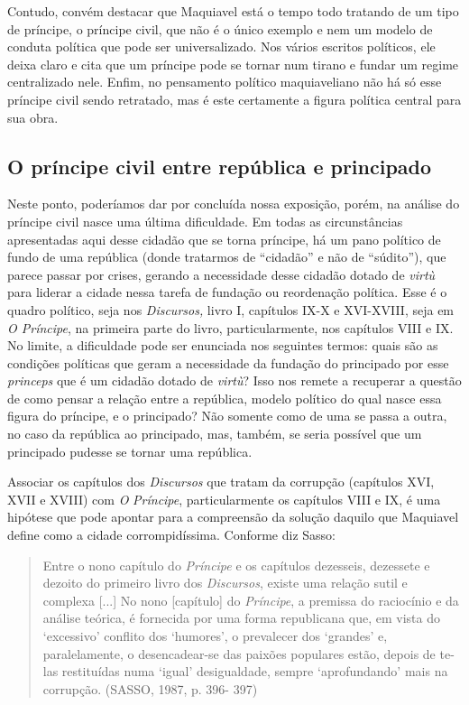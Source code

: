 Contudo, convém destacar que Maquiavel está o tempo todo tratando de um
tipo de príncipe, o príncipe civil, que não é o único exemplo e nem um
modelo de conduta política que pode ser universalizado. Nos vários
escritos políticos, ele deixa claro e cita que um príncipe pode se
tornar num tirano e fundar um regime centralizado nele. Enfim, no
pensamento político maquiaveliano não há só esse príncipe civil sendo
retratado, mas é este certamente a figura política central para sua
obra.

\subsection{O príncipe civil entre república e principado}

Neste ponto, poderíamos dar por concluída nossa exposição, porém, na
análise do príncipe civil nasce uma última dificuldade. Em todas as
circunstâncias apresentadas aqui desse cidadão que se torna príncipe, há
um pano político de fundo de uma república (donde tratarmos de
``cidadão'' e não de ``súdito''), que parece passar por crises, gerando
a necessidade desse cidadão dotado de \emph{virtù} para liderar a cidade
nessa tarefa de fundação ou reordenação política. Esse é o quadro
político, seja nos \emph{Discursos,} livro I, capítulos IX-X e
XVI-XVIII, seja em \emph{O Príncipe}, na primeira parte do livro,
particularmente, nos capítulos VIII e IX. No limite, a dificuldade pode
ser enunciada nos seguintes termos: quais são as condições políticas que
geram a necessidade da fundação do principado por esse \emph{princeps}
que é um cidadão dotado de \emph{virtù}? Isso nos remete a recuperar a
questão de como pensar a relação entre a república, modelo político do
qual nasce essa figura do príncipe, e o principado? Não somente como de
uma se passa a outra, no caso da república ao principado, mas, também,
se seria possível que um principado pudesse se tornar uma república.

Associar os capítulos dos \emph{Discursos} que tratam da corrupção
(capítulos XVI, XVII e XVIII) com \emph{O} \emph{Príncipe},
particularmente os capítulos VIII e IX, é uma hipótese que pode apontar
para a compreensão da solução daquilo que Maquiavel define como a cidade
corrompidíssima. Conforme diz Sasso:

\begin{quote}
Entre o nono capítulo do \emph{Príncipe} e os capítulos dezesseis,
dezessete e dezoito do primeiro livro dos \emph{Discursos}, existe uma
relação sutil e complexa {[}...{]} No nono {[}capítulo{]} do
\emph{Príncipe}, a premissa do raciocínio e da análise teórica, é
fornecida por uma forma republicana que, em vista do `excessivo'
conflito dos `humores', o prevalecer dos `grandes' e, paralelamente, o
desencadear-se das paixões populares estão, depois de te-las restituídas
numa `igual' desigualdade, sempre `aprofundando' mais na corrupção.
(SASSO, 1987, p. 396- 397)
\end{quote}

